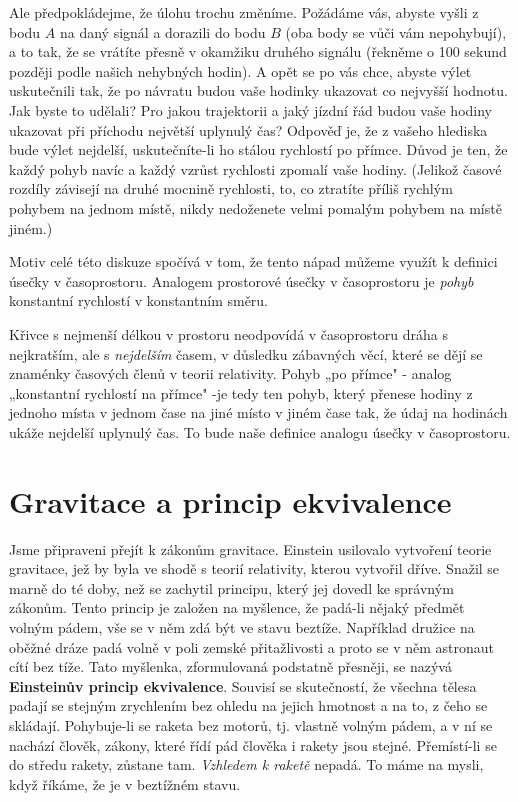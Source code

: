     Ale předpokládejme, že úlohu trochu změníme. Požádáme vás, abyste vyšli z bodu \(A\) na daný 
    signál a dorazili do bodu \(B\) (oba body se vůči vám nepohybují), a to tak, že se vrátíte 
    přesně v okamžiku druhého signálu (řekněme o \num{100} sekund později podle našich nehybných 
    hodin). A opět se po vás chce, abyste výlet uskutečnili tak, že po návratu budou vaše hodinky 
    ukazovat co nejvyšší hodnotu. Jak byste to udělali? Pro jakou trajektorii a jaký jízdní řád 
    budou vaše hodiny ukazovat při příchodu největší uplynulý čas? Odpověď je, že z vašeho hlediska 
    bude výlet nejdelší, uskutečníte-li ho stálou rychlostí po přímce. Důvod je ten, že každý pohyb 
    navíc a každý vzrůst rychlosti zpomalí vaše hodiny. (Jelikož časové rozdíly závisejí na druhé 
    mocnině rychlosti, to, co ztratíte příliš rychlým pohybem na jednom místě, nikdy nedoženete 
    velmi pomalým pohybem na místě jiném.)
     
    Motiv celé této diskuze spočívá v tom, že tento nápad můžeme využít k definici úsečky v 
    časoprostoru. Analogem prostorové úsečky v časoprostoru je \emph{pohyb} konstantní rychlostí v 
    konstantním směru. 
    
    Křivce s nejmenší délkou v prostoru neodpovídá v časoprostoru dráha s nejkratším, ale s 
    \emph{nejdelším} časem, v důsledku zábavných věcí, které se dějí se znaménky časových členů v 
    teorii relativity. Pohyb „po přímce" - analog „konstantní rychlostí na přímce" -je tedy ten 
    pohyb, který přenese hodiny z jednoho místa v jednom čase na jiné místo v jiném čase tak, že 
    údaj na hodinách ukáže nejdelší uplynulý čas. To bude naše definice analogu úsečky v 
    časoprostoru.
    
  \section{Gravitace a princip ekvivalence}\label{fyz:IIchapXLIIsecV}
    Jsme připraveni přejít k zákonům gravitace. Einstein usilovalo vytvoření teorie gravitace, jež 
    by byla ve shodě s teorií relativity, kterou vytvořil dříve. Snažil se marně do té doby, než se 
    zachytil principu, který jej dovedl ke správným zákonům. Tento princip je založen na myšlence, 
    že padá-li nějaký předmět volným pádem, vše se v něm zdá být ve stavu beztíže. Například 
    družice na oběžné dráze padá volně v poli zemské přitažlivosti a proto se v něm astronaut cítí 
    bez tíže. Tato myšlenka, zformulovaná podstatně přesněji, se nazývá \textbf{Einsteinův princip 
    ekvivalence}. Souvisí se skutečností, že všechna tělesa padají se stejným zrychlením bez ohledu 
    na jejich hmotnost a na to, z čeho se skládají. Pohybuje-li se raketa bez motorů, tj. vlastně 
    volným pádem, a v ní se nachází člověk, zákony, které řídí pád člověka i rakety jsou stejné. 
    Přemístí-li se do středu rakety, zůstane tam. \emph{Vzhledem k raketě} nepadá. To máme na 
    mysli, když říkáme, že je v beztížném stavu.
    
